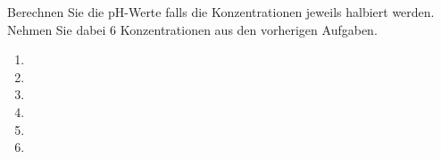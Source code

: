 \begin{questions}





\ifprintanswers
{}
\else
\clearpage
\fi




\question[6]
Berechnen Sie die pH-Werte falls die Konzentrationen jeweils halbiert werden. 
Nehmen Sie dabei 6 Konzentrationen aus den vorherigen Aufgaben.

   \ifprintanswers
   {
    \begin{solution}
        
        \begin{enumerate}
            \item {}
            \item {}
            \item {}
            \item {}
            \item {}
            \item {}
        \end{enumerate}
    \end{solution}
}
    \else
        \makeemptybox{3cm}
        \makeemptybox{3cm}
        \makeemptybox{3cm}
        \makeemptybox{3cm}
        \makeemptybox{3cm}
        \makeemptybox{3cm}
    \fi





\end{questions}

